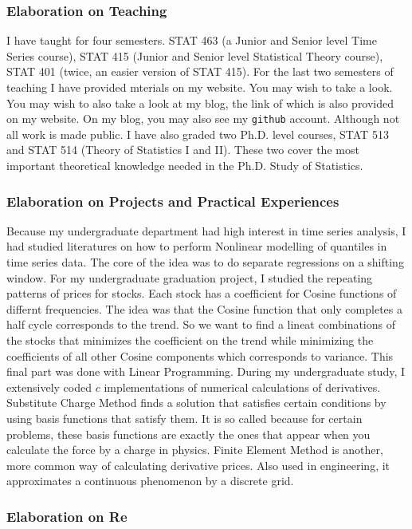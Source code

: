\documentclass[utf8,letterpaper,oneside]{article}
\begin{document}
\subsubsection*{Elaboration on Teaching}
I have taught for four semesters. STAT 463 (a Junior and Senior level Time Series course), STAT 415 (Junior and Senior level Statistical Theory course), STAT 401 (twice, an easier version of STAT 415). For the last two semesters of teaching I have provided mterials on my website. You may wish to take a look. You may wish to also take a look at my blog, the link of which is also provided on my website. On my blog, you may also see my \texttt{github} account. Although not all work is made public. I have also graded two Ph.D. level courses, STAT 513 and STAT 514 (Theory of Statistics I and II). These two cover the most important theoretical knowledge needed in the Ph.D. Study of Statistics.
\subsubsection*{Elaboration on Projects and Practical Experiences}
Because my undergraduate department had high interest in time series analysis, I had studied literatures on how to perform Nonlinear modelling of quantiles in time series data. The core of the idea was to do separate regressions on a shifting window. For my undergraduate graduation project, I studied the repeating patterns of prices for stocks. Each stock has a coefficient for Cosine functions of differnt frequencies. The idea was that the Cosine function that only completes a half cycle corresponds to the trend. So we want to find a lineat combinations of the stocks that minimizes the coefficient on the trend while minimizing the coefficients of all other Cosine components which corresponds to variance. This final part was done with Linear Programming. During my undergraduate study, I extensively coded $c$ implementations of numerical calculations of derivatives. Substitute Charge Method finds a solution that satisfies certain conditions by using basis functions that satisfy them. It is so called because for certain problems, these basis functions are exactly the ones that appear when you calculate the force by a charge in physics. Finite Element Method is another, more common way of calculating derivative prices. Also used in engineering, it approximates a continuous phenomenon by a discrete grid.
\subsubsection*{Elaboration on Re}
\end{document}
